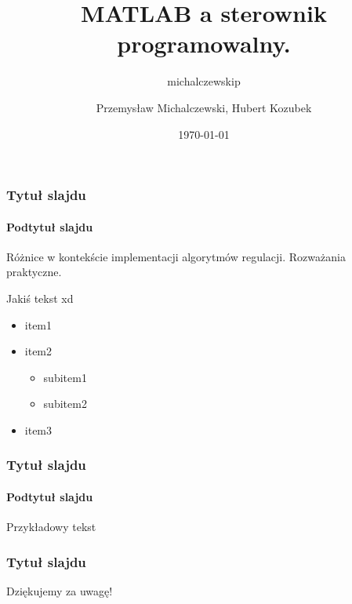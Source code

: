 \documentclass[aspectratio=169]{beamer}
\author{michalczewskip}
\title[PUST]{MATLAB a sterownik programowalny.
}
\author{Przemysław Michalczewski, Hubert Kozubek}
\date{\today}
\begin{document}
\begin{frame}[plain]
\maketitle
\end{frame}





\begin{frame}
\frametitle{Tytuł slajdu}
\framesubtitle{Podtytuł slajdu}

 Różnice w kontekście implementacji algorytmów regulacji.
 Rozważania praktyczne.

Jakiś tekst xd

\begin{itemize}
  \item item1
  \item item2
  \begin{itemize}
    \item subitem1
    \item subitem2
  \end{itemize}
  \item item3
\end{itemize}

\end{frame}




\begin{frame}
\frametitle{Tytuł slajdu}
\framesubtitle{Podtytuł slajdu}

Przykładowy tekst

\begin{figure}
    \centering
    
\end{figure}

\end{frame}




\begin{frame}
\frametitle{Tytuł slajdu}



\begin{center}
\LARGE Dziękujemy za uwagę!

\end{center}
\end{frame}
\end{document}
